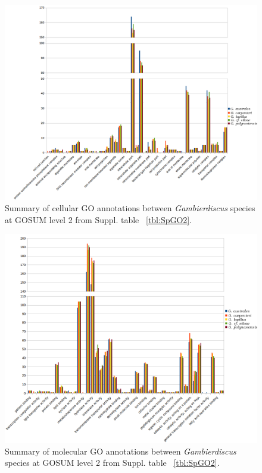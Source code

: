 \documentclass[12pt]{article}
\begin{document}
\begin{figure} 
\includegraphics[scale=.6]{3Aug18_cluster-investigation/figures/gosum-species/Species-gosum2-cell2-split.png} 
\caption{Summary of cellular GO annotations between \textit{Gambierdiscus} species at GOSUM level 2 from Suppl. table ~\ref{tbl:SpGO2}.} 
\label{fig:SpecGo2Cell}
\end{figure} 


\begin{figure} 
\includegraphics[scale=.6]{3Aug18_cluster-investigation/figures/gosum-species/Species-gosum2-molec-split.png} 
\caption{Summary of molecular GO annotations between \textit{Gambierdiscus} species at GOSUM level 2 from Suppl. table ~\ref{tbl:SpGO2}.}  
\label{fig:SpecGo2Molec}
\end{figure} 
\end{document}
